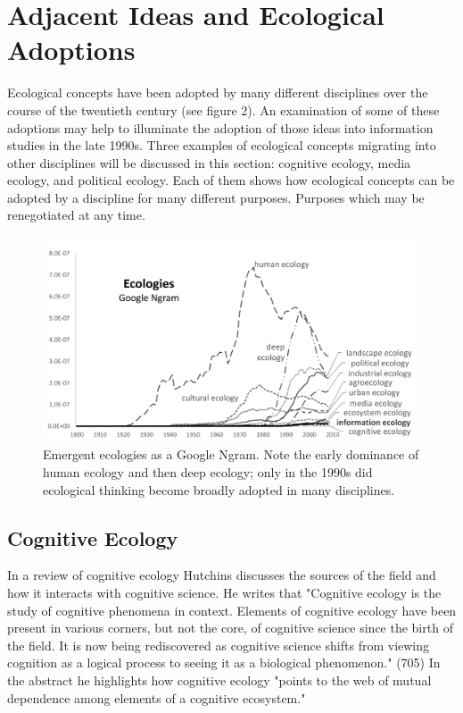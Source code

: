 \section{Adjacent Ideas and Ecological Adoptions}

Ecological concepts have been adopted by many different disciplines over the course of the twentieth century (see figure 2). An examination of some of these adoptions may help to illuminate the adoption of those ideas into information studies in the late 1990s. Three examples of ecological concepts migrating into other disciplines will be discussed in this section: cognitive ecology, media ecology, and political ecology. Each of them shows how ecological concepts can be adopted by a discipline for many different purposes. Purposes which may be renegotiated at any time.

\begin{figure}[!ht]
  \centering
    \includegraphics[width=5.5in]{figures/ecologiesAll}
  \caption{Emergent ecologies as a Google Ngram. Note the early dominance of human ecology and then deep ecology; only in the 1990s did ecological thinking become broadly adopted in many disciplines.}
\end{figure}

\subsection{Cognitive Ecology}

In a review of cognitive ecology Hutchins \citep{hutchins_cognitive_2010} discusses the sources of the field and how it interacts with cognitive science. He writes that "Cognitive ecology is the study of cognitive phenomena in context. Elements of cognitive ecology have been present in various corners, but not the core, of cognitive science since the birth of the field. It is now being rediscovered as cognitive science shifts from viewing cognition as a logical process to seeing it as a biological phenomenon." (705) In the abstract he highlights how cognitive ecology "points to the web of mutual dependence among elements of a cognitive ecosystem."

